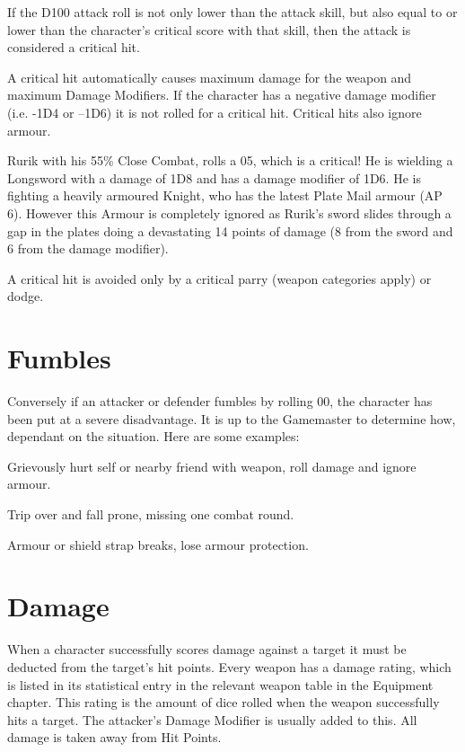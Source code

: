 If the D100 attack roll is not only lower than the attack skill, but also equal to or lower than the character’s critical score with that skill, then the attack is considered a critical hit. 

A critical hit automatically causes maximum damage for the weapon and maximum Damage Modifiers. If the character has a negative damage modifier (i.e. -1D4 or –1D6) it is not rolled for a critical hit. Critical hits also ignore armour.

\begin{rpg-examplebox}
 Rurik with his 55\% Close Combat, rolls a 05, which is a critical! He is wielding a Longsword with a damage of 1D8 and has a damage modifier of 1D6. He is fighting a heavily armoured Knight, who has the latest Plate Mail armour (AP 6). However this Armour is completely ignored as Rurik’s sword slides through a gap in the plates doing a devastating 14 points of damage (8 from the sword and 6 from the damage modifier).
\end{rpg-examplebox}

A critical hit is avoided only by a critical parry (weapon categories apply) or dodge.



\section{Fumbles}
Conversely if an attacker or defender fumbles by rolling 00, the character has been put at a severe disadvantage. It is up to the Gamemaster to determine how, dependant on the situation. Here are some examples:
\begin{rpg-list}
	\item Grievously hurt self or nearby friend with weapon, roll damage and ignore armour.
	\item Trip over and fall prone, missing one combat round.
	\item Armour or shield strap breaks, lose armour protection.
\end{rpg-list}



\section{Damage}
When a character successfully scores damage against a target it must be deducted from the target’s hit points. Every weapon has a damage rating, which is listed in its statistical entry in the relevant weapon table in the Equipment chapter. This rating is the amount of dice rolled when the weapon successfully hits a target. The attacker’s Damage Modifier is usually added to this. All damage is taken away from Hit Points. 

